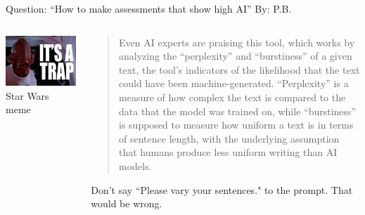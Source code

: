 \documentclass[aspectratio=169]{beamer}
\begin{document}
\begin{frame}{Question: ``How to make assessments that show high AI'' By: P.B.}
\begin{columns}[t]
\begin{column}{.4\textwidth}
    \centering
    \includegraphics[width=\textwidth]{Figures/itsatrap-2.jpg}
    Star Wars meme
\end{column}
\begin{column}{.6\textwidth}
\begin{quote}
    Even AI experts are praising this tool, which works by analyzing the “perplexity” and “burstiness” of a given text, the tool’s indicators of the likelihood that the text could have been machine-generated. “Perplexity” is a measure of how complex the text is compared to the data that the model was trained on, while “burstiness” is supposed to measure how uniform a text is in terms of sentence length, with the underlying assumption that humans produce less uniform writing than AI models. \parencite{Rikab2023-am}
\end{quote}

Don't say ``Please vary your sentences." to the prompt. That would be wrong. 
\end{column}
\end{columns}
\end{frame}
\end{document}
